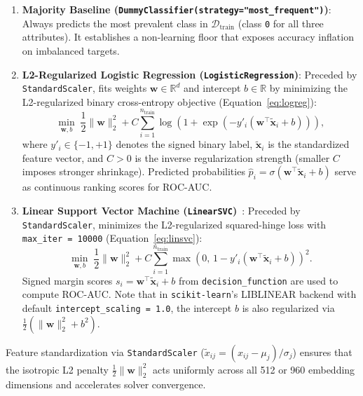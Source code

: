 \documentclass[12pt,a4paper]{article}
\newcommand{\code}[1]{\texttt{#1}}
\begin{document}
\begin{enumerate}[leftmargin=20pt, itemsep=3pt]
  \item \textbf{Majority Baseline (\code{DummyClassifier(strategy="most\_\allowbreak{}frequent")})}: Always predicts the most prevalent class in $\mathcal{D}_{\text{train}}$ (class \code{0} for all three attributes). It establishes a non-learning floor that exposes accuracy inflation on imbalanced targets.
  \item \textbf{L2-Regularized Logistic Regression (\code{LogisticRegression})}: Preceded by \code{StandardScaler}, fits weights $\mathbf{w} \in \mathbb{R}^{d}$ and intercept $b \in \mathbb{R}$ by minimizing the L2-regularized binary cross-entropy objective (Equation~\eqref{eq:logreg}):
  \begin{equation}
    \min_{\mathbf{w}, b} \; \frac{1}{2}\|\mathbf{w}\|_2^2 + C \sum_{i=1}^{n_{\text{train}}} \log\!\left(1 + \exp\!\left(-y'_i (\mathbf{w}^\top \tilde{\mathbf{x}}_i + b)\right)\right),
    \label{eq:logreg}
  \end{equation}
  where $y'_i \in \{-1, +1\}$ denotes the signed binary label, $\tilde{\mathbf{x}}_i$ is the standardized feature vector, and $C > 0$ is the inverse regularization strength (smaller $C$ imposes stronger shrinkage). Predicted probabilities $\hat{p}_i = \sigma(\mathbf{w}^\top \tilde{\mathbf{x}}_i + b)$ serve as continuous ranking scores for ROC-AUC.
  \item \textbf{Linear Support Vector Machine (\code{LinearSVC})}~\cite{fan2008liblinear}: Preceded by \code{StandardScaler}, minimizes the L2-regularized squared-hinge loss with \code{max\_\allowbreak{}iter = 10000} (Equation~\eqref{eq:linsvc}):
  \begin{equation}
    \min_{\mathbf{w}, b} \; \frac{1}{2}\|\mathbf{w}\|_2^2 + C \sum_{i=1}^{n_{\text{train}}} \max\!\left(0,\, 1 - y'_i (\mathbf{w}^\top \tilde{\mathbf{x}}_i + b)\right)^2.
    \label{eq:linsvc}
  \end{equation}
  Signed margin scores $s_i = \mathbf{w}^\top \tilde{\mathbf{x}}_i + b$ from \code{decision\_\allowbreak{}function} are used to compute ROC-AUC. Note that in \code{scikit-learn}'s LIBLINEAR backend with default \code{intercept\_\allowbreak{}scaling = 1.0}, the intercept $b$ is also regularized via $\frac{1}{2}(\|\mathbf{w}\|_2^2 + b^2)$.
\end{enumerate}

Feature standardization via \code{StandardScaler} ($\tilde{x}_{ij} = (x_{ij} - \mu_j)/\sigma_j$) ensures that the isotropic L2 penalty $\frac{1}{2}\|\mathbf{w}\|_2^2$ acts uniformly across all 512 or 960 embedding dimensions and accelerates solver convergence.
\end{document}
